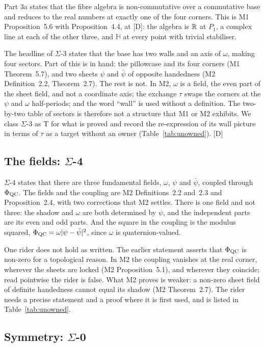 \documentclass[11pt,a4paper]{article}
\theoremstyle{plain}
\theoremstyle{definition}
\theoremstyle{remark}
\newcommand{\Hquat}{\mathbb{H}}
\newcommand{\rigD}{[\textup{D}]}
\newcommand{\Sig}[1]{$\Sigma$-#1}
\begin{document}
Part 3a states that the fibre algebra is non-commutative over a commutative base and reduces to the real numbers at exactly one of the four corners. This is M1 Proposition~5.6 with Proposition~4.4, at \rigD: the algebra is $\mathbb{R}$ at $P_{1}$, a complex line at each of the other three, and $\Hquat$ at every point with trivial stabiliser.

The headline of \Sig{3} states that the base has two walls and an axis of $\omega$, making four sectors. Part of this is in hand: the pillowcase and its four corners (M1 Theorem~5.7), and two sheets $\psi$ and $\bar\psi$ of opposite handedness (M2 Definition~2.2, Theorem~2.7). The rest is not. In M2, $\omega$ is a field, the even part of the sheet field, and not a coordinate axis; the exchange $\tau$ swaps the corners at the $\psi$ and $\omega$ half-periods; and the word ``wall'' is used without a definition. The two-by-two table of sectors is therefore not a structure that M1 or M2 exhibits. We class \Sig{3} as T for what is proved and record the re-expression of its wall picture in terms of $\tau$ as a target without an owner (Table~\ref{tab:unowned}). \rigD

\subsection{The fields: \texorpdfstring{$\Sigma$}{Sigma}-4}\label{sec:sigma4}

\Sig{4} states that there are three fundamental fields, $\omega$, $\psi$ and $\bar\psi$, coupled through $\Phi_{\mathrm{QC}}$. The fields and the coupling are M2 Definitions~2.2 and~2.3 and Proposition~2.4, with two corrections that M2 settles. There is one field and not three: the shadow and $\omega$ are both determined by $\psi$, and the independent parts are its even and odd parts. And the square in the coupling is the modulus squared, $\Phi_{\mathrm{QC}}=\omega\lvert\psi-\bar\psi\rvert^{2}$, since $\omega$ is quaternion-valued.

One rider does not hold as written. The earlier statement asserts that $\Phi_{\mathrm{QC}}$ is non-zero for a topological reason. In M2 the coupling vanishes at the real corner, wherever the sheets are locked (M2 Proposition~5.1), and wherever they coincide; read pointwise the rider is false. What M2 proves is weaker: a non-zero sheet field of definite handedness cannot equal its shadow (M2 Theorem~2.7). The rider needs a precise statement and a proof where it is first used, and is listed in Table~\ref{tab:unowned}.

\subsection{Symmetry: \texorpdfstring{$\Sigma$}{Sigma}-0}\label{sec:sigma0}
\end{document}
